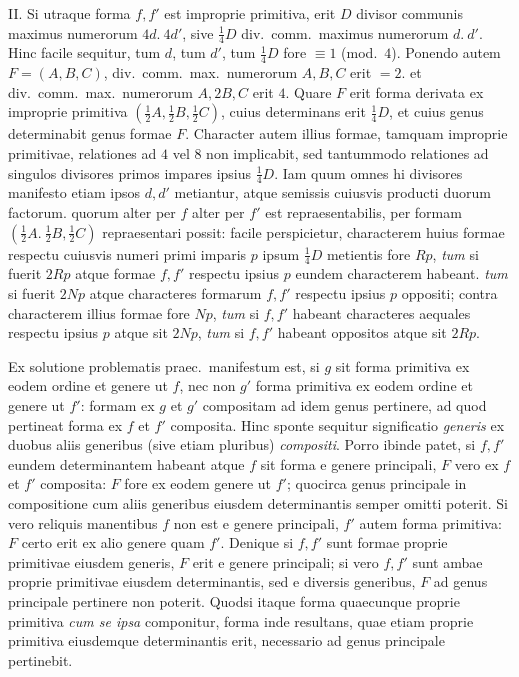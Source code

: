II. Si utraque forma $f,f'$ est improprie primitiva, erit $D$ divisor communis maximus numerorum $4d.\ 4d'$, sive $\frac{1}{4}D$ div.\ comm.\ maximus numerorum $d.\ d'$. Hinc facile sequitur, tum $d$, tum $d'$, tum $\frac{1}{4}D$ fore $\equiv1$ (mod.\ $4$). Ponendo autem $F=(A,B,C)$, div.\ comm.\ max.\ numerorum $A,B,C$ erit $=2$. et div.\ comm.\ max.\ numerorum $A,2B,C$ erit $4$. Quare $F$ erit forma derivata ex improprie primitiva $(\frac{1}{2}A,\frac{1}{2}B,\frac{1}{2}C)$, cuius determinans erit $\frac{1}{4}D$, et cuius genus determinabit genus formae $F$. Character autem illius formae, tamquam improprie primitivae, relationes ad $4$ vel $8$ non implicabit, sed tantummodo relationes ad singulos divisores primos impares ipsius $\frac{1}{4}D$. Iam quum omnes hi divisores manifesto etiam ipsos $d,d'$ metiantur, atque semissis cuiusvis producti duorum factorum. quorum alter per $f$ alter per $f'$ est repraesentabilis, per formam $(\frac{1}{2}A.\ \frac{1}{2}B,\frac{1}{2}C)$ repraesentari possit: facile perspicietur, characterem huius formae respectu cuiusvis numeri primi imparis $p$ ipsum $\frac{1}{4}D$ metientis fore $Rp$, \textit{tum} si fuerit $2Rp$ atque formae $f,f'$ respectu ipsius $p$ eundem characterem habeant. \textit{tum} si fuerit $2Np$ atque characteres formarum $f,f'$ respectu ipsius $p$ oppositi; contra characterem illius formae fore $Np$, \textit{tum} si $f,f'$ habeant characteres aequales respectu ipsius $p$ atque sit $2Np$, \textit{tum} si $f,f'$ habeant oppositos atque sit $2Rp$.

Ex solutione problematis praec.\ manifestum est, si $g$ sit forma primitiva ex eodem ordine et genere ut $f$, nec non $g'$ forma primitiva ex eodem ordine et genere ut $f'$: formam ex $g$ et $g'$ compositam ad idem genus pertinere, ad quod pertineat forma ex $f$ et $f'$ composita. Hinc sponte sequitur significatio \textit{generis}
ex duobus aliis generibus (sive etiam pluribus) \textit{compositi}. Porro ibinde patet, si $f,f'$ eundem determinantem habeant atque $f$ sit forma e genere principali, $F$ vero ex $f$ et $f'$ composita: $F$ fore ex eodem genere ut $f'$; quocirca genus principale in compositione cum aliis generibus eiusdem determinantis semper omitti poterit. Si vero reliquis manentibus $f$ non est e genere principali, $f'$ autem forma primitiva: $F$ certo erit ex alio genere quam $f'$. Denique si $f,f'$ sunt formae proprie primitivae eiusdem generis, $F$ erit e genere principali; si vero $f,f'$ sunt ambae proprie primitivae eiusdem determinantis, sed e diversis generibus, $F$ ad genus principale pertinere non poterit. Quodsi itaque forma quaecunque proprie primitiva \textit{cum se ipsa} componitur, forma inde resultans, quae etiam proprie primitiva eiusdemque determinantis erit, necessario ad genus principale pertinebit.

